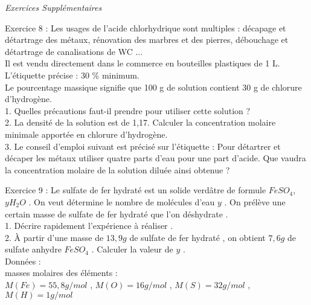 \documentclass[12pt, french]{article}
\begin{document}
\vspace{2cm}
\begin{center}
   \Large{ \em{Exercices Supplémentaires}}
\end{center}
\begin{Box2}{Exercice 8 : }
Les usages de l'acide chlorhydrique sont multiples : décapage et détartrage des métaux, rénovation des marbres et des pierres, débouchage et détartrage de canalisations de WC ...\\
Il est vendu directement dans le commerce en bouteilles plastiques de 1 L.
L'étiquette précise : 30 \% minimum. \\Le pourcentage massique signifie que 100 g de solution contient 30 g
de chlorure d'hydrogène.
\\1. Quelles précautions faut-il prendre pour utiliser cette solution ?
\\2. La densité de la solution est de 1,17. Calculer la concentration molaire minimale apportée en chlorure
d'hydrogène.
\\3. Le conseil d'emploi suivant est précisé sur l'étiquette : Pour détartrer et décaper les métaux utiliser quatre
parts d'eau pour une part d'acide. Que vaudra la concentration molaire de la solution diluée ainsi obtenue ?
\end{Box2}

\begin{Box2}{Exercice 9 :}
Le sulfate de fer hydraté est un solide verdâtre de formule $FeSO_4$, $yH_2O$ . On veut détermine 
le nombre de molécules d’eau $y$ . On prélève une certain masse de sulfate de fer hydraté que
l’on déshydrate .
\\1. Décrire rapidement l’expérience à réaliser .
\\2. À partir d’une masse de $13, 9g$ de sulfate de fer hydraté , on obtient $7, 6g$ de sulfate
anhydre $FeSO_4$ . Calculer la valeur de $y$ .
\\Données :
\\masses molaires des éléments : \\$M(Fe) = 55,8g/mol$ , $M(O) = 16g/mol$ , $M(S) = 32g/mol$ ,
$M(H) = 1g/mol$

   \end{Box2}
\end{document}
